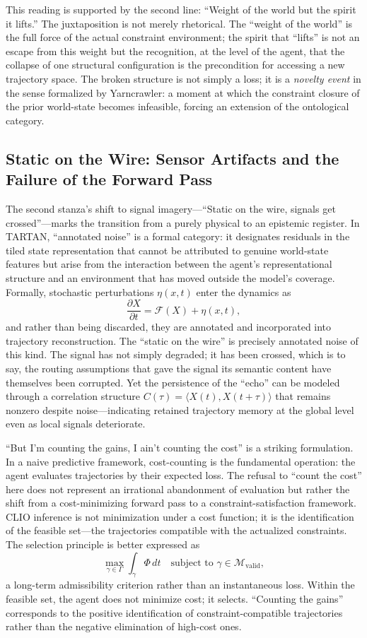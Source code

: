 \documentclass[12pt, a4paper]{article}
\begin{document}
This reading is supported by the second line: ``Weight of the world but the spirit it lifts.'' The juxtaposition is not merely rhetorical. The ``weight of the world'' is the full force of the actual constraint environment; the spirit that ``lifts'' is not an escape from this weight but the recognition, at the level of the agent, that the collapse of one structural configuration is the precondition for accessing a new trajectory space. The broken structure is not simply a loss; it is a \textit{novelty event} in the sense formalized by Yarncrawler: a moment at which the constraint closure of the prior world-state becomes infeasible, forcing an extension of the ontological category.

\subsection{Static on the Wire: Sensor Artifacts and the Failure of the Forward Pass}

The second stanza's shift to signal imagery---``Static on the wire, signals get crossed''---marks the transition from a purely physical to an epistemic register. In TARTAN, ``annotated noise'' is a formal category: it designates residuals in the tiled state representation that cannot be attributed to genuine world-state features but arise from the interaction between the agent's representational structure and an environment that has moved outside the model's coverage. Formally, stochastic perturbations $\eta(x,t)$ enter the dynamics as
\[
\frac{\partial X}{\partial t} = \mathcal{F}(X) + \eta(x,t),
\]
and rather than being discarded, they are annotated and incorporated into trajectory reconstruction. The ``static on the wire'' is precisely annotated noise of this kind. The signal has not simply degraded; it has been crossed, which is to say, the routing assumptions that gave the signal its semantic content have themselves been corrupted. Yet the persistence of the ``echo'' can be modeled through a correlation structure $C(\tau) = \langle X(t), X(t+\tau)\rangle$ that remains nonzero despite noise---indicating retained trajectory memory at the global level even as local signals deteriorate.

``But I'm counting the gains, I ain't counting the cost'' is a striking formulation. In a naive predictive framework, cost-counting is the fundamental operation: the agent evaluates trajectories by their expected loss. The refusal to ``count the cost'' here does not represent an irrational abandonment of evaluation but rather the shift from a cost-minimizing forward pass to a constraint-satisfaction framework. CLIO inference is not minimization under a cost function; it is the identification of the feasible set---the trajectories compatible with the actualized constraints. The selection principle is better expressed as
\[
\max_{\gamma \in \Gamma} \int_{\gamma} \Phi\, dt \quad \text{subject to } \gamma \in \mathcal{M}_{\text{valid}},
\]
a long-term admissibility criterion rather than an instantaneous loss. Within the feasible set, the agent does not minimize cost; it selects. ``Counting the gains'' corresponds to the positive identification of constraint-compatible trajectories rather than the negative elimination of high-cost ones.
\end{document}

